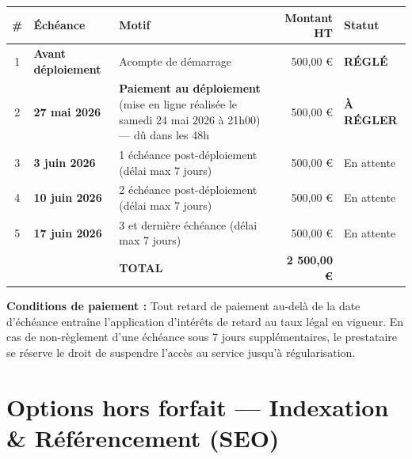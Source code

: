 \documentclass[a4paper,11pt]{article}
\begin{document}
\begin{tabularx}{\textwidth}{c >{\bfseries}p{3.2cm} X r >{\centering\arraybackslash}p{2.8cm}}
  \toprule
  \rowcolor{primary}
  \color{white}\# & \color{white}Échéance & \color{white}Motif & \color{white}Montant HT & \color{white}Statut \\
  \midrule
  \rowcolor{lightgray}
  1 & Avant déploiement & Acompte de démarrage & 500,00 € & \textcolor{success}{\bfseries RÉGLÉ} \\
  \midrule
  2 & \textbf{27 mai 2026} & \textbf{Paiement au déploiement} (mise en ligne réalisée le samedi 24 mai 2026 à 21h00) — dû dans les 48h & 500,00 € & \textcolor{accent}{\bfseries À RÉGLER} \\
  \midrule
  \rowcolor{lightgray}
  3 & \textbf{3 juin 2026} & 1\iere{} échéance post-déploiement (délai max 7 jours) & 500,00 € & En attente \\
  \midrule
  4 & \textbf{10 juin 2026} & 2\ieme{} échéance post-déploiement (délai max 7 jours) & 500,00 € & En attente \\
  \midrule
  \rowcolor{lightgray}
  5 & \textbf{17 juin 2026} & 3\ieme{} et dernière échéance (délai max 7 jours) & 500,00 € & En attente \\
  \midrule
  \rowcolor{primary}
  & & \color{white}\textbf{TOTAL} & \color{white}\textbf{2 500,00 €} & \\
  \bottomrule
\end{tabularx}

\vspace{8pt}
\colorbox{warning!30}{\parbox{\textwidth}{
  \vspace{4pt}
  \textbf{Conditions de paiement :} Tout retard de paiement au-delà de la date d'échéance entraîne l'application d'intérêts de retard au taux légal en vigueur. En cas de non-règlement d'une échéance sous 7 jours supplémentaires, le prestataire se réserve le droit de suspendre l'accès au service jusqu'à régularisation.
  \vspace{4pt}
}}

\newpage

\section{Options hors forfait — Indexation \& Référencement (SEO)}
\end{document}
